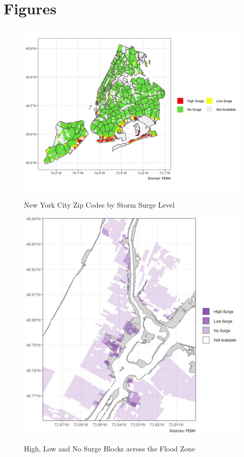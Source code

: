 \documentclass[12pt]{article}
\begin{document}
{{{{{{\clearpage





\clearpage
\section{Figures} 


\begin{figure}[h!]
\caption{New York City Zip Codes by Storm Surge Level}
\includegraphics[scale = 0.22]{Samples/maps_zipcodeall.png}
\label{fig:zipmap}
\end{figure}

\clearpage
\begin{figure}[h!]
\begin{center}
\caption{High, Low and No Surge Blocks across the Flood Zone}
\includegraphics[scale = 0.55]{Samples/ues2.1.pdf}
\label{fig:ues}
\end{center}
\end{figure}

}}}}}}
\end{document}
